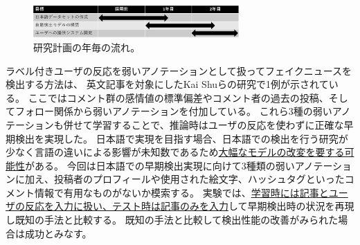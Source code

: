 \setlength\intextsep{0pt}
\setlength\textfloatsep{0pt}
\begin{figure}
    \centering
    \includegraphics[width=0.7\textwidth]{figs/plan.pdf}
    \vspace{-1cm} 
    \caption{研究計画の年毎の流れ。}
    \label{fig:plan}
\end{figure}
ラベル付きユーザの反応を弱いアノテーションとして扱ってフェイクニュースを検出する方法は、
英文記事を対象にしたKai Shuらの研究で1例が示されている\cite{shu2020leveraging}。
ここではコメント群の感情値の標準偏差やコメント者の過去の投稿、そしてフォロー関係から弱いアノテーションを付加している。
これら3種の弱いアノテーションも併せて学習することで、推論時はユーザの反応を使わずに正確な早期検出を実現した。
日本語で実現を目指す場合、日本語での検出を行う研究が少なく言語の違いによる影響が未知数であるため\underline{大幅なモデルの改変を要する可能性}がある。
今回は日本語での早期検出実現に向けて3種類の弱いアノテーションに加え、投稿者のプロフィールや使用された絵文字、ハッシュタグといったコメント情報で有用なものがないか模索する。
実験では、\underline{学習時には記事とユーザの反応を入力に扱い、テスト時は記事のみを入力}して早期検出時の状況を再現し既知の手法と比較する。
既知の手法と比較して検出性能の改善がみられた場合は成功とみなす。

